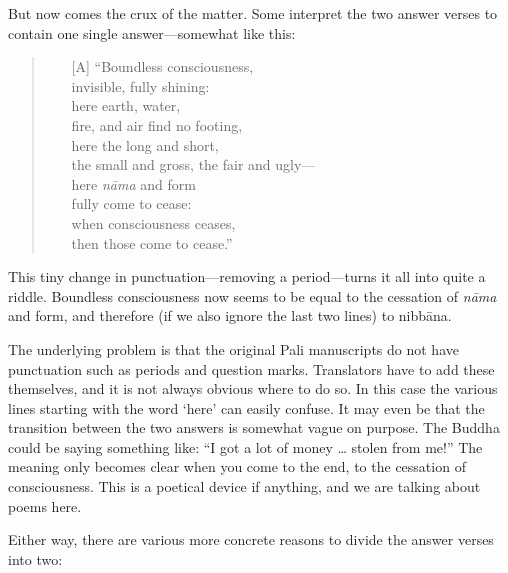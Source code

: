 \documentclass[10pt, openany]{book}
\begin{document}
\vspace* {1em}\noindent
But now comes the crux of the matter. Some interpret the two answer verses to contain one single answer—somewhat like this:


\begin{quote}


\begin{itemize}

\item[{[A]}]“Boundless consciousness, \\ invisible, fully shining: \\ here earth, water, \\ fire, and air find no footing, \\ here the long and short, \\ the small and gross, the fair and ugly— \\ here \textit{nāma} and form \\ fully come to cease: \\ when consciousness ceases, \\ then those come to cease.”

\end{itemize}

\end{quote}
This tiny change in punctuation—removing a period—turns it all into quite a riddle. Boundless consciousness now seems to be equal to the cessation of \textit{nāma} and form, and therefore (if we also ignore the last two lines) to nibbāna.


The underlying problem is that the original Pali manuscripts do not have punctuation such as periods and question marks. Translators have to add these themselves, and it is not always obvious where to do so. In this case the various lines starting with the word ‘here’ can easily confuse. It may even be that the transition between the two answers is somewhat vague on purpose. The Buddha could be saying something like: “I got a lot of money … stolen from me!” The meaning only becomes clear when you come to the end, to the cessation of consciousness. This is a poetical device if anything, and we are talking about poems here.


Either way, there are various more concrete reasons to divide the answer verses into two:
\end{document}
